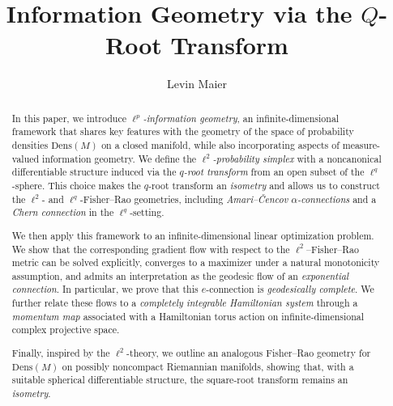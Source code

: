 \documentclass[12pt]{amsart}
\numberwithin{figure}{section}
\numberwithin{table}{section}
\numberwithin{equation}{section}
\begin{document}
\title[Information Geometry via the $Q$-Root Transform]{Information Geometry via the $Q$-Root Transform}

\author{Levin Maier}
\address{Faculty of Mathematics and Computer Science,
	University of Heidelberg}



\begin{abstract}
In this paper, we introduce \emph{$\ell^p$-information geometry}, an infinite-dimensional framework that shares key features with the geometry of the space of probability densities \( \mathrm{Dens}(M) \) on a closed manifold, while also incorporating aspects of measure-valued information geometry. We define the \emph{$\ell^2$-probability simplex} with a noncanonical differentiable structure induced via the \emph{$q$-root transform} from an open subset of the \( \ell^q \)-sphere. This choice makes the \(q\)-root transform an \emph{isometry} and allows us to construct the \(\ell^2\)- and \(\ell^q\)-Fisher--Rao geometries, including \emph{Amari--\v{C}encov \(\alpha\)-connections} and a \emph{Chern connection} in the \(\ell^q\)-setting.

We then apply this framework to an infinite-dimensional linear optimization problem. We show that the corresponding gradient flow with respect to the \(\ell^2\)--Fisher--Rao metric can be solved explicitly, converges to a maximizer under a natural monotonicity assumption, and admits an interpretation as the geodesic flow of an \emph{exponential connection}. In particular, we prove that this \(e\)-connection is \emph{geodesically complete}. We further relate these flows to a \emph{completely integrable Hamiltonian system} through a \emph{momentum map} associated with a Hamiltonian torus action on infinite-dimensional complex projective space.

Finally, inspired by the \(\ell^2\)-theory, we outline an analogous Fisher--Rao geometry for \( \mathrm{Dens}(M) \) on possibly noncompact Riemannian manifolds, showing that, with a suitable spherical differentiable structure, the square-root transform remains an \emph{isometry}.
\end{abstract}


\maketitle
\setcounter{tocdepth}{1}
\tableofcontents
\end{document}

